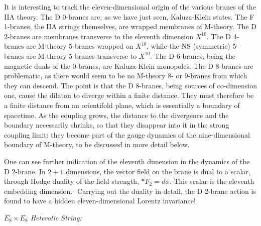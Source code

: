 It is interesting to track the eleven-dimensional origin of the various
branes of the IIA theory.  The D 0-branes are, as we have just seen,
Kaluza-Klein states. The F 1-branes, the IIA strings themselves, are
wrapped membranes of M-theory.\cite{supmem}  The D 2-branes are membranes
transverse to the eleventh dimension $X^{10}$.  The D 4-branes are M-theory
5-branes wrapped on $X^{10}$, while the NS (symmetric) 5-branes are
M-theory 5-branes transverse to $X^{10}$.  The D 6-branes, being the
magnetic duals of the 0-branes, are Kaluza-Klein monopoles.  The
D 8-branes are problematic, as there would seem to be no M-theory 8- or
9-branes from which they can descend.  The point is that the D 8-branes,
being sources of co-dimension one, cause the dilaton to diverge within a
finite distance.\cite{polwit}  They must therefore be a finite distance from
an orientifold plane, which is essentially a boundary of spacetime.  As
the coupling grows, the distance to the divergence and the boundary
necessarily shrinks, so that they disappear into it in the strong coupling
limit: they become part of the gauge dynamics of the nine-dimensional
boundary of M-theory,\cite{horwit} to be discussed in more detail below.

One can see further indication of the eleventh dimension in the dynamics
of the D 2-brane.  In $2+1$ dimensions, the vector field on the brane is
dual to a scalar, through Hodge duality of the field strength, $*F_2 =
d\phi$.  This scalar is the eleventh embedding 
dimension.\cite{duff11}$^{\!,\,}$\cite{towndf}
Carrying out the duality in detail, the D 2-brane action is found to have
a hidden eleven-dimensional Lorentz invariance!

{\it $E_8 \times E_8$ Heterotic String:}

